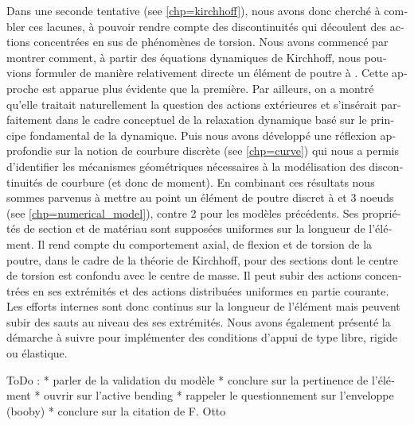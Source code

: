 \begin{otherlanguage}{french}
Dans une seconde tentative (see \cref{chp=kirchhoff}), nous avons donc cherché à combler ces lacunes, à pouvoir rendre compte des discontinuités qui découlent des actions concentrées en sus de phénomènes de torsion. Nous avons commencé par montrer comment, à partir des équations dynamiques de Kirchhoff, nous pouvions formuler de manière relativement directe un élément de poutre à . Cette approche est apparue plus évidente que la première. Par ailleurs, on a montré qu'elle traitait naturellement la question des actions extérieures et s'insérait parfaitement dans le cadre conceptuel de la relaxation dynamique basé sur le principe fondamental de la dynamique. Puis nous avons développé une réflexion approfondie sur la notion de courbure discrète (see \cref{chp=curve}) qui nous a permis d'identifier les mécanismes géométriques nécessaires à la modélisation des discontinuités de courbure (et donc de moment). En combinant ces résultats nous sommes parvenus à mettre au point un élément de poutre discret à  et 3 noeuds (see \cref{chp=numerical_model}), contre 2 pour les modèles précédents. Ses propriétés de section et de matériau sont supposées uniformes sur la longueur de l'élément. Il rend compte du comportement axial, de flexion et de torsion de la poutre, dans le cadre de la théorie de Kirchhoff, pour des sections dont le centre de torsion est confondu avec le centre de masse. Il peut subir des actions concentrées en ses extrémités et des actions distribuées uniformes en partie courante. Les efforts internes sont donc continus sur la longueur de l'élément mais peuvent subir des sauts au niveau des ses extrémités. Nous avons également présenté la démarche à suivre pour implémenter des conditions d'appui de type libre, rigide ou élastique.

ToDo :
* parler de la validation du modèle
* conclure sur la pertinence de l'élément
* ouvrir sur l'active bending
* rappeler le questionnement sur l'enveloppe (booby)
* conclure sur la citation de F. Otto


\end{otherlanguage}
